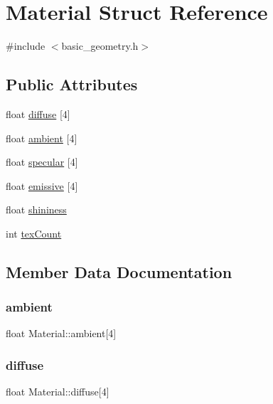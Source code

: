 \hypertarget{struct_material}{}\section{Material Struct Reference}
\label{struct_material}


{\ttfamily \#include $<$basic\+\_\+geometry.\+h$>$}

\subsection*{Public Attributes}
\begin{DoxyCompactItemize}
\item 
float \hyperlink{struct_material_aa928d7b743a327e07cc5176e5d4d89c8}{diffuse} \mbox{[}4\mbox{]}
\item 
float \hyperlink{struct_material_a01a42e2eed3cd6662bd46786a441473a}{ambient} \mbox{[}4\mbox{]}
\item 
float \hyperlink{struct_material_a570719a080c2168e8c0225c085472c64}{specular} \mbox{[}4\mbox{]}
\item 
float \hyperlink{struct_material_a374ee687979c26f4a9e3d671d89a9751}{emissive} \mbox{[}4\mbox{]}
\item 
float \hyperlink{struct_material_a9dc184c883ec135ace28c1917af3fe84}{shininess}
\item 
int \hyperlink{struct_material_ad0964c5d437284a4dc9cfbe6e6dcafcc}{tex\+Count}
\end{DoxyCompactItemize}


\subsection{Member Data Documentation}
\mbox{\label{struct_material_a01a42e2eed3cd6662bd46786a441473a}} 
\subsubsection{\texorpdfstring{ambient}{ambient}}
{\footnotesize\ttfamily float Material\+::ambient\mbox{[}4\mbox{]}}

\mbox{\label{struct_material_aa928d7b743a327e07cc5176e5d4d89c8}} 
\subsubsection{\texorpdfstring{diffuse}{diffuse}}
{\footnotesize\ttfamily float Material\+::diffuse\mbox{[}4\mbox{]}}

